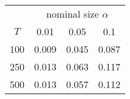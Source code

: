 % 
\begin{tabular}{cccc}
  \hline
  & \multicolumn{3}{c}{nominal size $\alpha$} \\
 $T$ & 0.01 & 0.05 & 0.1 \\
 \hline
100 & 0.009 & 0.045 & 0.087 \\ 
  250 & 0.013 & 0.063 & 0.117 \\ 
  500 & 0.013 & 0.057 & 0.112 \\ 
   \hline
\end{tabular}
